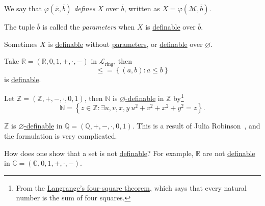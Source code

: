 \begin{notation}[Define]\label{not:define}
	We say that \(\varphi (\overline{x} , \overline{b} )\) \emph{defines} \(X\) over \(\overline{b} \), written as \(X = \varphi (\mathcal{M} , \overline{b} )\).
\end{notation}

\begin{notation}[Parameter]\label{not:parameter}
	The tuple \(\overline{b} \) is called the \emph{parameters} when \(X\) is \hyperref[def:definable]{definable} over \(\overline{b} \).
\end{notation}

\begin{remark}
	Sometimes \(X\) is \hyperref[def:definable]{definable} without \hyperref[not:parameter]{parameters}, or \hyperref[def:definable]{definable} over \(\varnothing \).
\end{remark}

\begin{eg}
	Take \(\mathbb{R} =(\mathbb{R} , 0, 1, +, \cdot, -)\) in \(\mathcal{L} _{\text{ring} }\), then
	\[
		\leq = \left\{ (a, b) \colon a \leq b\right\}
	\]
	is \hyperref[def:definable]{definable}.
\end{eg}

\begin{eg}
	Let \(\mathbb{Z} =(\mathbb{Z} , +, -, \cdot, 0, 1)\), then \(\mathbb{N} \) is \hyperref[def:definable]{\(\varnothing \)-definable} in \(\mathbb{Z} \) by\footnote{From the \href{https://en.wikipedia.org/wiki/Lagrange's_four-square_theorem}{Langrange's four-square theorem}, which says that every natural number is the sum of four squares.}
	\[
		\mathbb{N} = \left\{ z\in \mathbb{Z} \colon \exists u, v, x, y\ u^2 + v^2 + x^2 + y^2 = z \right\}.
	\]
\end{eg}

\begin{eg}
	\(\mathbb{Z} \) is \hyperref[def:definable]{\(\varnothing \)-definable} in \(\mathbb{Q} = (\mathbb{Q} , +, -, \cdot, 0, 1)\). This is a result of Julia Robinson~\cite{robinson_1949}, and the formulation is very complicated.
\end{eg}

\begin{problem*}
	How does one show that a set is not \hyperref[def:definable]{definable}? For example, \(\mathbb{R} \) are not \hyperref[def:definable]{definable} in \(\mathbb{C} = (\mathbb{C} , 0, 1, +, \cdot, -)\).
\end{problem*}